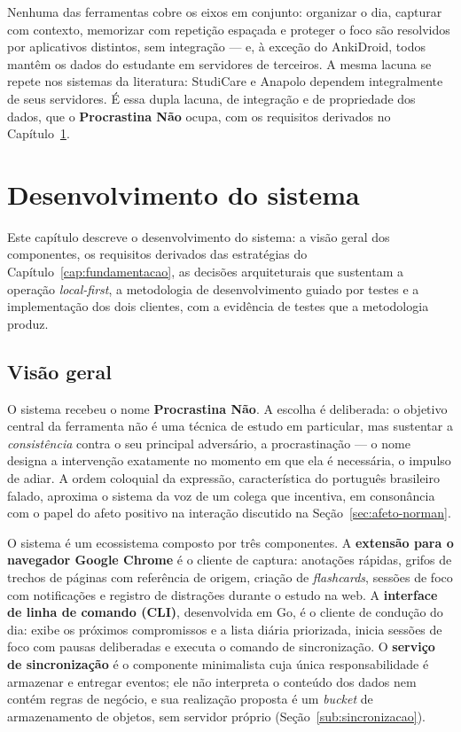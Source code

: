 \documentclass[12pt, %
openright, 
oneside,
a4paper,
english,   %
brazil]{facom-ufu-abntex2}
\begin{document}
Nenhuma das ferramentas cobre os eixos em conjunto: organizar o dia, capturar
com contexto, memorizar com repetição espaçada e proteger o foco são
resolvidos por aplicativos distintos, sem integração --- e, à exceção do
AnkiDroid, todos mantêm os dados do estudante em servidores de terceiros. A
mesma lacuna se repete nos sistemas da literatura: StudiCare e Anapolo
dependem integralmente de seus servidores. É
essa dupla lacuna, de integração e de propriedade dos dados, que o
\textbf{Procrastina Não} ocupa, com os requisitos derivados no
Capítulo~\ref{cap:desenvolvimento}.

\chapter{Desenvolvimento do sistema}
\label{cap:desenvolvimento}
Este capítulo descreve o desenvolvimento do sistema: a visão geral dos
componentes, os requisitos derivados das estratégias do Capítulo~\ref{cap:fundamentacao}, as
decisões arquiteturais que sustentam a operação \textit{local-first}, a
metodologia de desenvolvimento guiado por testes e a implementação dos dois
clientes, com a evidência de testes que a metodologia produz.

\section{Visão geral}
\label{sec:visao-geral}

O sistema recebeu o nome \textbf{Procrastina Não}. A escolha é deliberada: o
objetivo central da ferramenta não é uma técnica de estudo em particular, mas
sustentar a \textit{consistência} contra o seu principal adversário, a procrastinação --- o nome designa a intervenção exatamente
no momento em que ela é necessária, o impulso de adiar. A ordem coloquial
da expressão, característica do português brasileiro falado, aproxima o
sistema da voz de um colega que incentiva, em consonância com o papel do
afeto positivo na interação discutido na Seção~\ref{sec:afeto-norman}.

O sistema é um ecossistema composto por três componentes. A \textbf{extensão
para o navegador Google Chrome} é o cliente de captura: anotações rápidas,
grifos de trechos de páginas com referência de origem, criação de
\textit{flashcards}, sessões de foco com notificações e registro de distrações
durante o estudo na web. A \textbf{interface de linha de comando (CLI)},
desenvolvida em Go, é o cliente de condução do dia: exibe os próximos
compromissos e a lista diária priorizada, inicia sessões de foco com pausas
deliberadas e executa o comando de sincronização. O \textbf{serviço de
sincronização} é o componente minimalista cuja única responsabilidade é
armazenar e entregar eventos; ele não interpreta o conteúdo dos dados nem
contém regras de negócio, e sua realização proposta é um \textit{bucket} de
armazenamento de objetos, sem servidor próprio
(Seção~\ref{sub:sincronizacao}).
\end{document}

